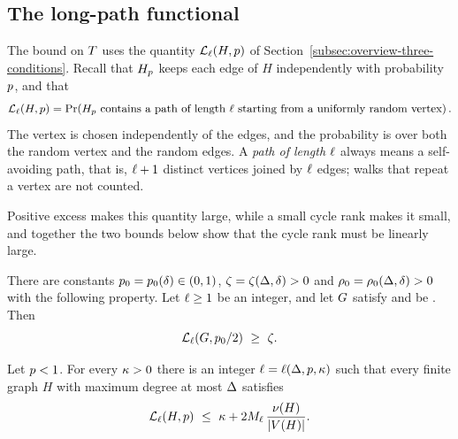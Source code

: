 \subsection{The long-path functional}\label{subsec:long-path}

The bound on \(T\) uses the quantity \(\mathcal{L}_{\ell}(H,p)\) of
Section~\ref{subsec:overview-three-conditions}. Recall that
\(H_{p}\) keeps each edge of \(H\) independently with probability
\(p\), and that
\begin{equation}\label{eq:long-path-functional}
  \Lpath{\plen}{H}{\keepp}
  =\Prx{\perc{H}{\keepp}\text{ contains a path of length }\plen
  \text{ starting from a uniformly random vertex}} .
\end{equation}
The vertex is chosen independently of the edges, and the probability is over
both the random vertex and the random edges. A \emph{path of length \(\ell\)}
always means a self-avoiding path, that is, \(\ell+1\) distinct vertices joined
by \(\ell\) edges; walks that repeat a vertex are not counted.

Positive excess makes this quantity large, while a small cycle rank makes it
small, and together the two bounds below show that the cycle rank must be
linearly large.

\begin{lemma}
\label{lem:high-functional}
There are constants \(p_0=p_0(\delta)\in(0,1)\),
\(\zeta=\zeta(\Delta,\delta)>0\) and \(\rho_0=\rho_0(\Delta,\delta)>0\) with the
following property. Let \(\ell\ge1\) be an integer, and let \(G\) satisfy
\Hyp{} and be \loctree{\plen}{\nontreez}. Then
\begin{equation}\label{eq:high-functional}
  \mathcal{L}_{\ell}(G,p_0/2)\ \ge\ \zeta .
\end{equation}
\end{lemma}

\begin{lemma}
\label{lem:low-functional}
Let \(p<1\). For every \(\kappa>0\) there is an integer
\(\ell=\ell(\Delta,p,\kappa)\) such that every finite graph \(H\) with
maximum degree at most \(\Delta\) satisfies
\begin{equation}\label{eq:low-functional}
  \mathcal{L}_{\ell}(H,p)
  \ \le\
  \kappa+2M_{\ell}\,\frac{\nu(H)}{|V(H)|} .
\end{equation}
\end{lemma}

